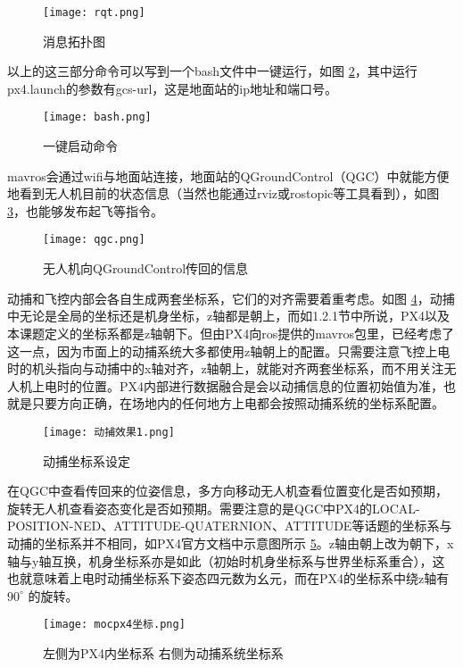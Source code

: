 \begin{figure}[!h]
  \centering
  \texttt{[image: rqt.png]}
  \caption{消息拓扑图}
  \label{rqt}
\end{figure}

以上的这三部分命令可以写到一个bash文件中一键运行，如图 \ref{一键}，其中运行px4.launch的参数有gcs-url，这是地面站的ip地址和端口号。
\begin{figure}[!h]
  \centering
  \texttt{[image: bash.png]}
  \caption{一键启动命令}
  \label{一键}
\end{figure}
mavros会通过wifi与地面站连接，地面站的QGroundControl（QGC）中就能方便地看到无人机目前的状态信息（当然也能通过rviz或rostopic等工具看到），如图 \ref{qgc}，也能够发布起飞等指令。
\begin{figure}[!h]
  \centering
  \texttt{[image: qgc.png]}
  \caption{无人机向QGroundControl传回的信息}
  \label{qgc}
\end{figure}
\newpage
动捕和飞控内部会各自生成两套坐标系，它们的对齐需要着重考虑。如图 \ref{动捕效果}，动捕中无论是全局的坐标还是机身坐标，z轴都是朝上，而如1.2.1节中所说，PX4以及本课题定义的坐标系都是z轴朝下。但由PX4向ros提供的mavros包里，已经考虑了这一点，因为市面上的动捕系统大多都使用z轴朝上的配置。只需要注意飞控上电时的机头指向与动捕中的x轴对齐，z轴朝上，就能对齐两套坐标系\cite{px4}，而不用关注无人机上电时的位置。PX4内部进行数据融合是会以动捕信息的位置初始值为准，也就是只要方向正确，在场地内的任何地方上电都会按照动捕系统的坐标系配置。
\begin{figure}[!h]
  \centering
  \texttt{[image: 动捕效果1.png]}
  \caption{动捕坐标系设定}
  \label{动捕效果}
\end{figure}

在QGC中查看传回来的位姿信息，多方向移动无人机查看位置变化是否如预期，旋转无人机查看姿态变化是否如预期。需要注意的是QGC中PX4的LOCAL-POSITION-NED、ATTITUDE-QUATERNION、ATTITUDE等话题的坐标系与动捕的坐标系并不相同，如PX4官方文档\cite{px4}中示意图所示 \ref{mocpx4}。z轴由朝上改为朝下，x轴与y轴互换，机身坐标系亦是如此（初始时机身坐标系与世界坐标系重合），这也就意味着上电时动捕坐标系下姿态四元数为幺元，而在PX4的坐标系中绕z轴有$90  ^{\circ}$ 的旋转。
\begin{figure}[!h]
  \centering
  \texttt{[image: mocpx4坐标.png]}
  \caption{左侧为PX4内坐标系 右侧为动捕系统坐标系}
  \label{mocpx4}
\end{figure}

